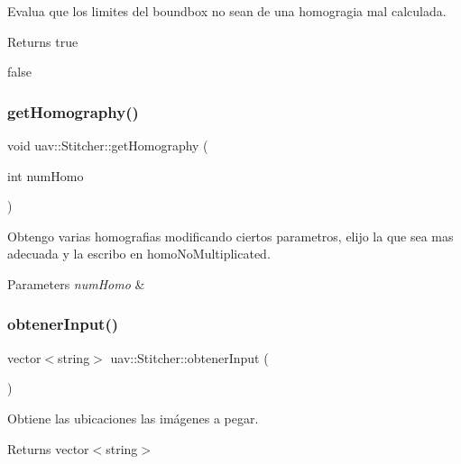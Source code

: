 Evalua que los limites del boundbox no sean de una homogragia mal calculada. 

\begin{DoxyReturn}{Returns}
true 

false 
\end{DoxyReturn}
\mbox{\label{classuav_1_1Stitcher_aafe09514806435e6258d8740b9f6c122}} 
\subsubsection{\texorpdfstring{get\+Homography()}{getHomography()}}
{\footnotesize\ttfamily void uav\+::\+Stitcher\+::get\+Homography (\begin{DoxyParamCaption}\item[{int}]{num\+Homo }\end{DoxyParamCaption})\hspace{0.3cm}{\ttfamily [inline]}}



Obtengo varias homografias modificando ciertos parametros, elijo la que sea mas adecuada y la escribo en homo\+No\+Multiplicated. 


\begin{DoxyParams}{Parameters}
{\em num\+Homo} & \\
\hline
\end{DoxyParams}
\mbox{\label{classuav_1_1Stitcher_a33521f40ecd0a4b57e3433b32c33f872}} 
\subsubsection{\texorpdfstring{obtener\+Input()}{obtenerInput()}}
{\footnotesize\ttfamily vector$<$string$>$ uav\+::\+Stitcher\+::obtener\+Input (\begin{DoxyParamCaption}{ }\end{DoxyParamCaption})\hspace{0.3cm}{\ttfamily [inline]}}



Obtiene las ubicaciones las imágenes a pegar. 

\begin{DoxyReturn}{Returns}
vector$<$string$>$ 
\end{DoxyReturn}
\mbox{\label{classuav_1_1Stitcher_a4a31cc35b3bc69697cdaa8094d4490b8}} 
